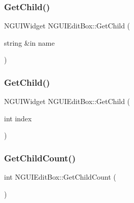 \subsubsection{\texorpdfstring{Get\+Child()}{GetChild()}\hspace{0.1cm}{\footnotesize\ttfamily [1/2]}}
{\footnotesize\ttfamily N\+G\+U\+I\+Widget N\+G\+U\+I\+Edit\+Box\+::\+Get\+Child (\begin{DoxyParamCaption}\item[{string \&in}]{name }\end{DoxyParamCaption})}

\hypertarget{class_n_g_u_i_edit_box_a27aa26e1ea0f622e22621cb9c96f0992}{}\label{class_n_g_u_i_edit_box_a27aa26e1ea0f622e22621cb9c96f0992} 
\subsubsection{\texorpdfstring{Get\+Child()}{GetChild()}\hspace{0.1cm}{\footnotesize\ttfamily [2/2]}}
{\footnotesize\ttfamily N\+G\+U\+I\+Widget N\+G\+U\+I\+Edit\+Box\+::\+Get\+Child (\begin{DoxyParamCaption}\item[{int}]{index }\end{DoxyParamCaption})}

\hypertarget{class_n_g_u_i_edit_box_a68f4a76c7af7575cb959cf3f34ecaa3e}{}\label{class_n_g_u_i_edit_box_a68f4a76c7af7575cb959cf3f34ecaa3e} 
\subsubsection{\texorpdfstring{Get\+Child\+Count()}{GetChildCount()}}
{\footnotesize\ttfamily int N\+G\+U\+I\+Edit\+Box\+::\+Get\+Child\+Count (\begin{DoxyParamCaption}{ }\end{DoxyParamCaption})}

\hypertarget{class_n_g_u_i_edit_box_aa54ed834ec03fd24f1f75fbbace4f2a1}{}\label{class_n_g_u_i_edit_box_aa54ed834ec03fd24f1f75fbbace4f2a1} 

